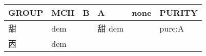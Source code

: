 \documentclass[14pt,a4paper]{scrartcl}
\begin{document}
\begin{longtable}[c]{@{}llllll@{}}
\toprule
\begin{minipage}[b]{0.14\columnwidth}\raggedright\strut
GROUP
\strut\end{minipage} &
\begin{minipage}[b]{0.14\columnwidth}\raggedright\strut
MCH
\strut\end{minipage} &
\begin{minipage}[b]{0.14\columnwidth}\raggedright\strut
B
\strut\end{minipage} &
\begin{minipage}[b]{0.14\columnwidth}\raggedright\strut
A
\strut\end{minipage} &
\begin{minipage}[b]{0.14\columnwidth}\raggedright\strut
none
\strut\end{minipage} &
\begin{minipage}[b]{0.14\columnwidth}\raggedright\strut
PURITY
\strut\end{minipage}\tabularnewline
\midrule
\endhead
\begin{minipage}[t]{0.14\columnwidth}\raggedright\strut
甜
\strut\end{minipage} &
\begin{minipage}[t]{0.14\columnwidth}\raggedright\strut
dem
\strut\end{minipage} &
\begin{minipage}[t]{0.14\columnwidth}\raggedright\strut
\strut\end{minipage} &
\begin{minipage}[t]{0.14\columnwidth}\raggedright\strut
甜 dem
\strut\end{minipage} &
\begin{minipage}[t]{0.14\columnwidth}\raggedright\strut
\strut\end{minipage} &
\begin{minipage}[t]{0.14\columnwidth}\raggedright\strut
pure:A
\strut\end{minipage}\tabularnewline
\begin{minipage}[t]{0.14\columnwidth}\raggedright\strut
㐁
\strut\end{minipage} &
\begin{minipage}[t]{0.14\columnwidth}\raggedright\strut
dem
\strut\end{minipage} &
\begin{minipage}[t]{0.14\columnwidth}\raggedright\strut
\strut\end{minipage} &
\begin{minipage}[t]{0.14\columnwidth}\raggedright\strut

\end{minipage}
\end{longtable}
\end{document}
